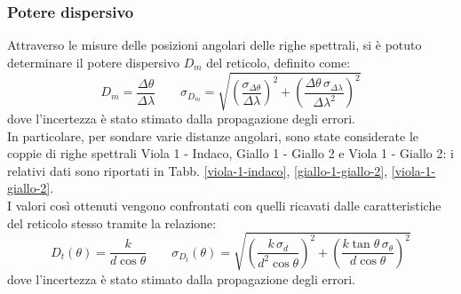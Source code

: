 \documentclass[]{article}
\begin{document}
    \subsubsection{Potere dispersivo}
    Attraverso le misure delle posizioni angolari delle righe spettrali, si è potuto determinare il potere dispersivo $D_{m}$ del reticolo, definito come:
    \begin{equation}
        \label{D-m}
        D_m = \frac{\Delta \theta}{\Delta \lambda} \qquad \sigma_{D_m} = \sqrt{\left(\frac{\sigma_{\Delta\theta}}{\Delta\lambda}\right)^2 + \left(\frac{\Delta\theta \, \sigma_{\Delta\lambda}}{\Delta\lambda^2}\right)^2}
    \end{equation}
    dove l'incertezza è stato stimato dalla propagazione degli errori.\\
    In particolare, per sondare varie distanze angolari, sono state considerate le coppie di righe spettrali Viola 1 - Indaco, Giallo 1 - Giallo 2 e Viola 1 - Giallo 2: i relativi dati sono riportati in Tabb. \ref{viola-1-indaco}, \ref{giallo-1-giallo-2}, \ref{viola-1-giallo-2}. \\
    I valori così ottenuti vengono confrontati con quelli ricavati dalle caratteristiche del reticolo stesso tramite la relazione:
    \begin{equation}
        \label{D-t}
        D_t(\theta) = \frac{k}{d\cos{\theta}} \qquad \sigma_{D_t}(\theta) = \sqrt{\left(\frac{k \, \sigma_d}{d^2 \cos{\theta}}\right)^2 + \left(\frac{k \tan{\theta} \, \sigma_\theta}{d\cos{\theta}}\right)^2}
    \end{equation}
    dove l'incertezza è stato stimato dalla propagazione degli errori.\\
\end{document}
